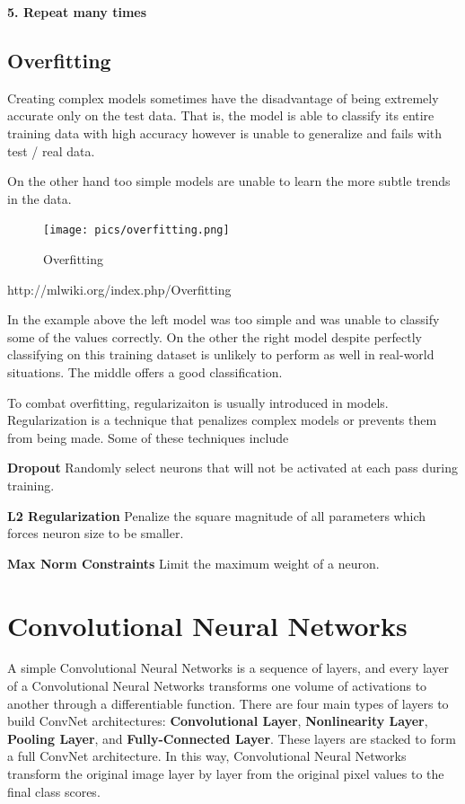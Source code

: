 \documentclass[twoside]{article}
\begin{document}
\textbf{5. Repeat many times}

\subsection{Overfitting}
Creating complex models sometimes have the disadvantage of being extremely accurate only on the test data. That is, the model is able to classify its entire training data with high accuracy however is unable to generalize and fails with test / real data.

On the other hand too simple models are unable to learn the more subtle trends in the data.

\begin{figure}[!htb]
\centering
\texttt{[image: pics/overfitting.png]}
\caption{Overfitting\cite{}}
\label{fig:Overfitting}
\end{figure}
http://mlwiki.org/index.php/Overfitting

In the example above the left model was too simple and was unable to classify some of the values correctly. On the other the right model despite perfectly classifying on this training dataset is unlikely to perform as well in real-world situations. The middle offers a good classification.

To combat overfitting, regularizaiton is usually introduced in models. Regularization is a technique that penalizes complex models or prevents them from being made. Some of these techniques include

\textbf{Dropout}
Randomly select neurons that will not be activated at each pass during training.

\textbf{L2 Regularization}
Penalize the square magnitude of all parameters which forces neuron size to be smaller.

\textbf{Max Norm Constraints}
Limit the maximum weight of a neuron.


\section{Convolutional Neural Networks}
A simple Convolutional Neural Networks is a sequence of layers, and every layer of a Convolutional Neural Networks transforms one volume of activations to another through a differentiable function. There are four main types of layers to build ConvNet architectures: \textbf{Convolutional Layer}, \textbf{Nonlinearity Layer}, \textbf{Pooling Layer}, and \textbf{Fully-Connected Layer}. These layers are stacked to form a full ConvNet architecture. In this way, Convolutional Neural Networks transform the original image layer by layer from the original pixel values to the final class scores.
\end{document}
